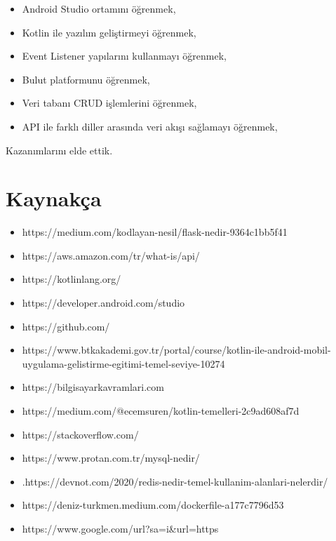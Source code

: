 \documentclass[conference]{IEEEtran}
\begin{document}
\begin{itemize}
    \item Android Studio ortamını öğrenmek,
    \item Kotlin ile yazılım geliştirmeyi öğrenmek,
    \item Event Listener yapılarını kullanmayı öğrenmek,
    \item Bulut platformunu öğrenmek,
    \item Veri tabanı CRUD işlemlerini öğrenmek,
    \item API ile farklı diller arasında veri akışı sağlamayı öğrenmek,

\end{itemize}

Kazanımlarını elde ettik.\\

\section{Kaynakça}

\begin{itemize}
    \item 
    https://medium.com/kodlayan-nesil/flask-nedir-9364c1bb5f41
    \item https://aws.amazon.com/tr/what-is/api/
    \item https://kotlinlang.org/
    \item https://developer.android.com/studio
    \item https://github.com/
    \item https://www.btkakademi.gov.tr/portal/course/kotlin-ile-android-mobil-uygulama-gelistirme-egitimi-temel-seviye-10274
    \item https://bilgisayarkavramlari.com
    \item https://medium.com/@ecemsuren/kotlin-temelleri-2c9ad608af7d
    \item https://stackoverflow.com/
    \item https://www.protan.com.tr/mysql-nedir/
    \item .https://devnot.com/2020/redis-nedir-temel-kullanim-alanlari-nelerdir/
    \item https://deniz-turkmen.medium.com/dockerfile-a177c7796d53
    \item https://www.google.com/url?sa=i&url=https%
    

\end{itemize}
\end{document}
